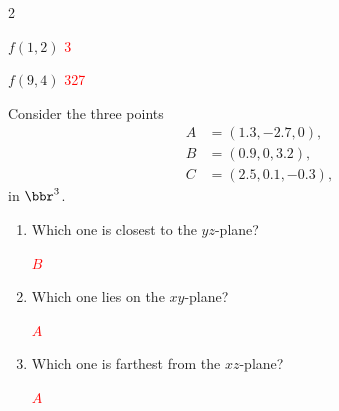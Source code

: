 \documentclass[12pt,reqno]{amsart}
\begin{document}
\medskip
\begin{henumerate}{2}
\item $f(1,2)$ \textcolor{red}{3}
\item $f(9,4)$ \textcolor{red}{327}
\end{henumerate}

\bigskip
\prob Consider the three points
\begin{align*}
A &= (1.3, -2.7,0), \\
B &= (0.9,0,3.2), \\
C &= (2.5,0.1,-0.3),
\end{align*}
in $\bbr^3$.

\medskip
\begin{enumerate}
\item Which one is closest to the $yz$-plane?

\bigskip
\textcolor{red}{$B$}
\bigskip

\item Which one lies on the $xy$-plane?

\bigskip
\textcolor{red}{$A$}
\bigskip

\item Which one is farthest from the $xz$-plane?

\bigskip
\textcolor{red}{$A$}
\bigskip

\end{enumerate}
\end{document}
